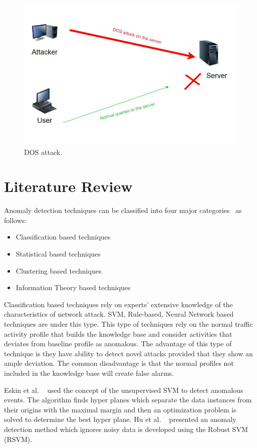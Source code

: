 \documentclass[14pt, conference]{IEEEtran}
\begin{document}
\begin{figure}[b]
  \includegraphics[width=\linewidth]{DOS2.JPG}
  \caption{DOS attack.}
  \label{fig:DOS}
\end{figure}

%
\section{Literature Review}
Anomaly detection techniques can be classified into  four major  categories~\cite{ahmed2014network} as follows:

\begin{itemize}
\item Classification based techniques
\item Statistical based techniques
\item Clustering based techniques
\item Information Theory based techniques
\end{itemize}

Classification based techniques rely on experts' extensive knowledge of the characteristics of network attack.
SVM, Rule-based, Neural Network based techniques are under this type. This type of techniques rely on the normal traffic activity profile that builds the knowledge base and consider activities that deviates from baseline profile as anomalous. The advantage of this type of technique is they have ability to detect novel attacks provided that they show an ample deviation. The common disadvantage is that the normal profiles not included in the knowledge base will create false alarms.

Eskin et al. ~\cite{eskin2002geometric} used the concept of the unsupervised SVM to detect anomalous events. The algorithm finds hyper planes which separate the data instances from their origins with the maximal margin and then an optimization problem is solved to determine the best hyper plane. Hu et al. ~\cite{hu2003robust} presented an anomaly detection method which ignores noisy data is developed using the Robust SVM (RSVM).\\
\end{document}
